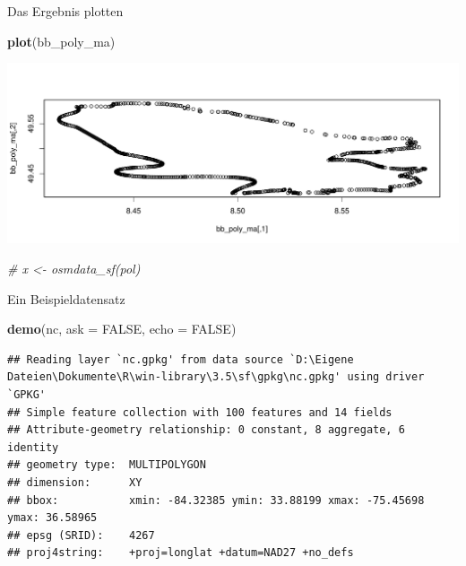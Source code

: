 \documentclass[ignorenonframetext,]{beamer}
\newenvironment{Shaded}{\begin{snugshade}}{\end{snugshade}}
\newcommand{\CommentTok}[1]{\textcolor[rgb]{0.56,0.35,0.01}{\textit{#1}}}
\newcommand{\DataTypeTok}[1]{\textcolor[rgb]{0.13,0.29,0.53}{#1}}
\newcommand{\KeywordTok}[1]{\textcolor[rgb]{0.13,0.29,0.53}{\textbf{#1}}}
\newcommand{\NormalTok}[1]{#1}
\newcommand{\OtherTok}[1]{\textcolor[rgb]{0.56,0.35,0.01}{#1}}
\begin{document}
\begin{frame}[fragile]{Das Ergebnis plotten}
\protect\hypertarget{das-ergebnis-plotten}{}

\begin{Shaded}
\begin{Highlighting}[]
\KeywordTok{plot}\NormalTok{(bb_poly_ma)}
\end{Highlighting}
\end{Shaded}

\includegraphics{simplefeatures_files/figure-beamer/unnamed-chunk-8-1.pdf}

\begin{Shaded}
\begin{Highlighting}[]
\CommentTok{# x <- osmdata_sf(pol)}
\end{Highlighting}
\end{Shaded}

\end{frame}

\begin{frame}[fragile]{Ein Beispieldatensatz}
\protect\hypertarget{ein-beispieldatensatz}{}

\begin{Shaded}
\begin{Highlighting}[]
\KeywordTok{demo}\NormalTok{(nc, }\DataTypeTok{ask =} \OtherTok{FALSE}\NormalTok{, }\DataTypeTok{echo =} \OtherTok{FALSE}\NormalTok{)}
\end{Highlighting}
\end{Shaded}

\begin{verbatim}
## Reading layer `nc.gpkg' from data source `D:\Eigene Dateien\Dokumente\R\win-library\3.5\sf\gpkg\nc.gpkg' using driver `GPKG'
## Simple feature collection with 100 features and 14 fields
## Attribute-geometry relationship: 0 constant, 8 aggregate, 6 identity
## geometry type:  MULTIPOLYGON
## dimension:      XY
## bbox:           xmin: -84.32385 ymin: 33.88199 xmax: -75.45698 ymax: 36.58965
## epsg (SRID):    4267
## proj4string:    +proj=longlat +datum=NAD27 +no_defs
\end{verbatim}

\end{frame}
\end{document}
